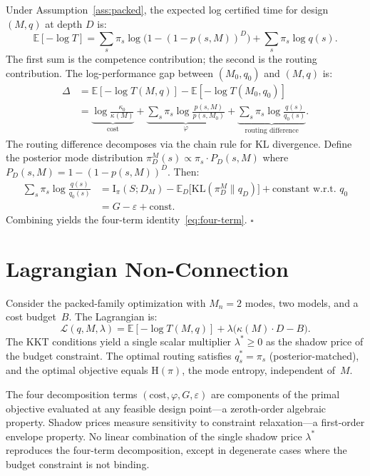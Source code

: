 \documentclass[11pt]{article}
\newcommand{\KL}{\mathrm{KL}}
\newcommand{\E}{\mathbb{E}}
\newcommand{\Mn}{M_n}
\newcommand{\qed}{\hfill\(\square\)}
\newcommand{\MI}{\mathrm{I}}
\newcommand{\Hent}{\mathrm{H}}
\newcommand{\mismatch}{\varepsilon}
\begin{document}
Under Assumption~\ref{ass:packed}, the expected log certified time for
design $(M, q)$ at depth $D$ is:
\begin{equation}
  \E[-\log T] = \sum_s \pi_s \log\bigl(1 - (1 - p(s,M))^D\bigr)
    + \sum_s \pi_s \log q(s).
\end{equation}
The first sum is the competence contribution; the second is the routing
contribution.  The log-performance gap between $(M_0, q_0)$ and $(M, q)$
is:
\begin{align}
  \Delta &= \E[-\log T(M,q)] - \E[-\log T(M_0, q_0)] \nonumber \\
  &= \underbrace{\log\frac{\kappa_0}{\kappa(M)}}_{\text{cost}}
    + \underbrace{\sum_s \pi_s \log\frac{p(s,M)}{p(s,M_0)}}_{\varphi}
    + \underbrace{\sum_s \pi_s \log\frac{q(s)}{q_0(s)}}_{\text{routing difference}}.
\end{align}
The routing difference decomposes via the chain rule for KL divergence.
Define the posterior mode distribution $\pi_D^M(s) \propto \pi_s \cdot
P_D(s,M)$ where $P_D(s,M) = 1 - (1-p(s,M))^D$.  Then:
\begin{align}
  \sum_s \pi_s \log\frac{q(s)}{q_0(s)}
  &= \MI_\pi(S; D_M)
    - \E_D\bigl[\KL(\pi_D^M \| q_D)\bigr]
    + \text{constant w.r.t.\ } q_0 \nonumber \\
  &= G - \mismatch + \text{const}.
\end{align}
Combining yields the four-term identity~\eqref{eq:four-term}. \qed

\section{Lagrangian Non-Connection}
\label{app:lagrangian}

Consider the packed-family optimization with $\Mn{=}2$ modes, two models,
and a cost budget~$B$.  The Lagrangian is:
\[
  \mathcal{L}(q, M, \lambda) = \E[-\log T(M, q)]
    + \lambda\bigl(\kappa(M) \cdot D - B\bigr).
\]
The KKT conditions yield a single scalar multiplier $\lambda^* \ge 0$
as the shadow price of the budget constraint.  The optimal routing satisfies
$q_s^* = \pi_s$ (posterior-matched), and the optimal objective equals
$\Hent(\pi)$, the mode entropy, independent of~$M$.

The four decomposition terms $(\text{cost}, \varphi, G, \mismatch)$ are
components of the primal objective evaluated at any feasible design
point---a zeroth-order algebraic property.  Shadow prices measure
sensitivity to constraint relaxation---a first-order envelope property.
No linear combination of the single shadow price $\lambda^*$ reproduces
the four-term decomposition, except in degenerate cases where the budget
constraint is not binding.
\end{document}
